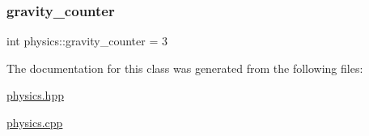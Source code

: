 \subsubsection{\texorpdfstring{gravity\+\_\+counter}{gravity\_counter}}
{\footnotesize\ttfamily int physics\+::gravity\+\_\+counter = 3\hspace{0.3cm}{\ttfamily [private]}}



The documentation for this class was generated from the following files\+:\begin{DoxyCompactItemize}
\item 
\hyperlink{physics_8hpp}{physics.\+hpp}\item 
\hyperlink{physics_8cpp}{physics.\+cpp}\end{DoxyCompactItemize}
